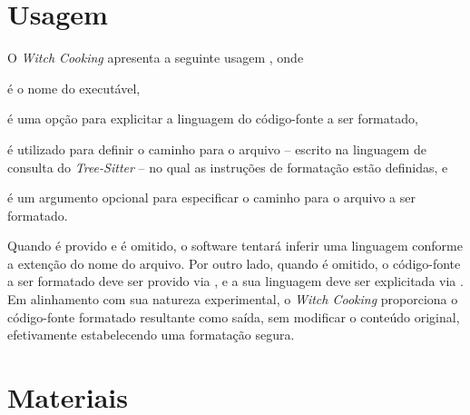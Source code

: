 \documentclass
  [11pt,a4paper,english,brazil,openright,sumario=tradicional,twoside]
  {abntex2}
\newcommand{\treesitter}{\textit{Tree-Sitter}\xspace}
\newcommand{\witchcooking}{\textit{Witch Cooking}\xspace}
\begin{document}

  \section{Usagem}
  \label{section:usage}

  O \witchcooking apresenta a seguinte usagem
  , onde
  \begin{inparaenum}
    \item {} é o nome do executável,
    \item \codesnippetinline{[-l LANG]} é uma opção para explicitar a linguagem
          do código-fonte a ser formatado,
    \item {} é utilizado para definir o caminho para
          o arquivo -- escrito na linguagem de consulta do \treesitter{} -- no
          qual as instruções de formatação estão definidas, e
    \item \codesnippetinline{[SRC]} é um argumento opcional para especificar o
          caminho para o arquivo a ser formatado.
  \end{inparaenum}
  Quando \codesnippetinline{[SRC]} é provido e \codesnippetinline{[-l LANG]} é
  omitido, o software tentará inferir uma linguagem conforme a extenção do nome
  do arquivo. Por outro lado, quando \codesnippetinline{[SRC]} é omitido, o
  código-fonte a ser formatado deve ser provido via \textit{},
  e a sua linguagem deve ser explicitada via \codesnippetinline{[-l LANG]}. Em
  alinhamento com sua natureza experimental, o \witchcooking proporciona o
  código-fonte formatado resultante como saída, sem modificar o conteúdo
  original, efetivamente estabelecendo uma formatação segura.


  \section{Materiais}
\end{document}
